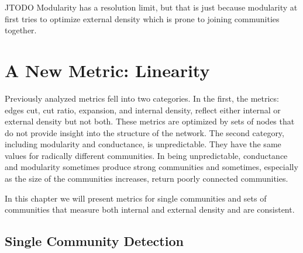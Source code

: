 \documentclass[phd,tocprelim]{cornell}
\begin{document}
JTODO Modularity has a resolution limit, but that is just because modularity at first tries to optimize external density which is prone to joining communities together. \cite{JTODO}



\chapter{A New Metric: Linearity}
\label{ch:linear}

Previously analyzed metrics fell into two categories.  In the first, the metrics: edges cut, cut ratio, expansion, and internal density, reflect either internal or external density but not both.  These metrics are optimized by sets of nodes that do not provide insight into the structure of the network.  The second category, including modularity and conductance, is unpredictable.  They have the same values for radically different communities.  In being unpredictable, conductance and modularity sometimes produce strong communities and sometimes, especially as the size of the communities increases, return poorly connected communities\cite{JTODO}.

In this chapter we will present metrics for single communities and sets of communities that measure both internal and external density and are consistent.


\section{Single Community Detection}
\end{document}
